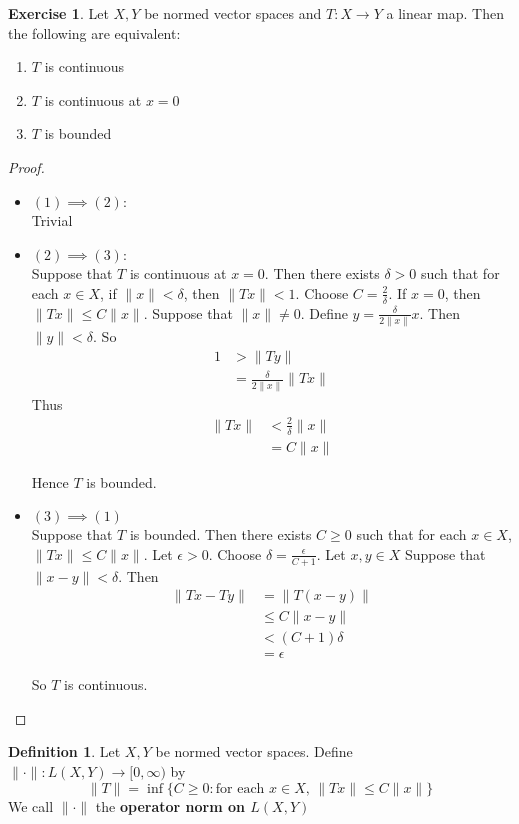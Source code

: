 \documentclass[12pt]{amsart}
\theoremstyle{definition}
\newtheorem{defn}[definition]{Definition}
\newtheorem{ex}[definition]{Exercise}
\newcommand{\del}{\delta}
\newcommand{\ep}{\epsilon}
\newcommand{\Rg}{[0,\infty)}
\newcommand{\lex}[1]{\label{ex:#1}}
\newcommand{\ld}[1]{\label{defn:#1}}
\begin{document}
	\begin{ex} \lex{42004}
		Let $X,Y$ be normed vector spaces and $T:X \rightarrow Y$ a linear map. Then the following are equivalent:
		\begin{enumerate}
			\item $T$ is continuous
			\item $T$ is continuous at $x=0$
			\item $T$ is bounded
		\end{enumerate}
	\end{ex}
	
	\begin{proof}\
		\begin{itemize}
		\item $(1) \implies (2)$:\\
		Trivial
		\item $(2) \implies (3)$:\\
		Suppose that $T$ is continuous at $x=0$. Then there exists $\del>0$ such that for each $x \in X$, if $\|x \|< \del$, then $\|Tx \|< 1$. Choose $C = \frac{2}{\del}$. If $x=0$, then $\|Tx \|\leq C \|x \|$. Suppose that $\|x \|\neq 0$. Define $y = \frac{\del}{2 \|x \|}x$. Then $\|y \|< \del$. So 
		\begin{align*}
		1 
		&> \|Ty \|\\
		&= \frac{\del}{2 \|x \|} \|Tx \|
		\end{align*}
		Thus 
		\begin{align*}
			\|Tx \|
			&< \frac{2}{\del} \|x \| \\
			&=C \|x \|
		\end{align*}
		
		Hence $T$ is bounded.
		\item $(3) \implies (1)$\\
		Suppose that $T$ is bounded. Then there exists $C \geq 0$ such that for each $x \in X$, $\|Tx \|\leq C\|x \|$. Let $\ep >0$. Choose $\del = \frac{\ep}{C+1}$. Let $x,y \in X$ Suppose that $\|x-y \|< \del$. Then 
		\begin{align*}
			\|Tx-Ty \|
			& = \|T(x-y) \| \\
			& \leq C \|x-y \|\\
			&< (C+1) \del\\ 
			&= \ep
		\end{align*}
		
		So $T$ is continuous.
		\end{itemize}
	\end{proof}
	
	\begin{defn} \ld{42005}
		Let $X,Y$ be normed vector spaces. Define $\|\cdot\|: L(X,Y)\rightarrow \Rg$ by $$\|T\| = \inf \{C \geq 0: \text{for each }x \in X\text{, } \|Tx \|\leq C\|x\|\}$$ We call $\|\cdot \|$ the \textbf{operator norm on $L(X,Y)$}
	\end{defn}
	
\end{document}

